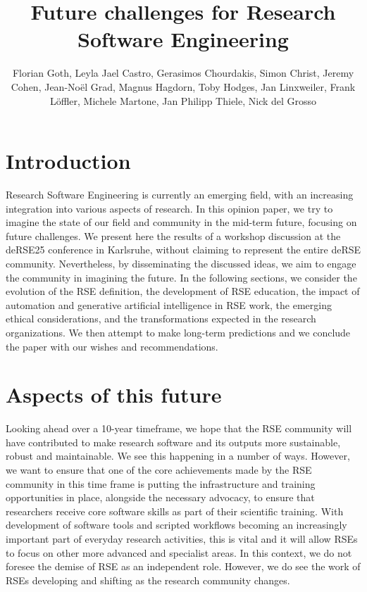 \documentclass{eceasst}
\title{Future challenges for Research Software Engineering} %
\author{
Florian Goth\texorpdfstring{\autref{1}}{},
Leyla Jael Castro\texorpdfstring{\autref{1}}{},
Gerasimos Chourdakis\texorpdfstring{\autref{1}}{},
Simon Christ\texorpdfstring{\autref{1}}{},
Jeremy Cohen\texorpdfstring{\autref{1}}{},
Jean-Noël Grad\texorpdfstring{\autref{1}}{},
Magnus Hagdorn\texorpdfstring{\autref{1}}{},
Toby Hodges\texorpdfstring{\autref{1}}{},
Jan Linxweiler\texorpdfstring{\autref{1}}{},
Frank Löffler\texorpdfstring{\autref{1}}{},
Michele Martone\texorpdfstring{\autref{1}}{},
Jan Philipp Thiele\texorpdfstring{\autref{1}}{},
Nick del Grosso\texorpdfstring{\autref{1}}{}
} %
\institute{\autlabel{1} Fantasy University} %
\begin{document}
\maketitle

\section{Introduction}

Research Software Engineering is currently an emerging field,
with an increasing integration into various aspects of research.
In this opinion paper, we try to imagine the state of our field
and community in the mid-term future, focusing on future challenges.
We present here the results of a workshop discussion at the
deRSE25 conference in Karlsruhe\cite{Goth2025EndRSEng}, without
claiming to represent the entire deRSE community.
Nevertheless, by disseminating the discussed ideas,
we aim to engage the community in imagining the future.
In the following sections, we consider the evolution of the RSE definition,
the development of RSE education,
the impact of automation and generative artificial intelligence in RSE work,
the emerging ethical considerations,
and the transformations expected in the research organizations.
We then attempt to make long-term predictions
and we conclude the paper with our wishes and recommendations.

\section{Aspects of this future}
Looking ahead over a 10-year timeframe, we hope that the RSE community will have
contributed to make research software and its outputs
more sustainable, robust and maintainable. We see this happening in a number of ways. However,
we want to ensure that one of the core achievements made by the RSE community in this time
frame is putting the infrastructure and training opportunities in place, alongside the necessary
advocacy, to ensure that researchers receive core software skills as part of their scientific training.
With development of software tools and scripted workflows becoming an increasingly important part of everyday
research activities, this is vital and it will allow RSEs to focus on other more advanced and specialist
areas. In this context, we do not foresee the demise of RSE as an independent role. However, we
do see the work of RSEs developing and shifting as the research community changes.
\end{document}
